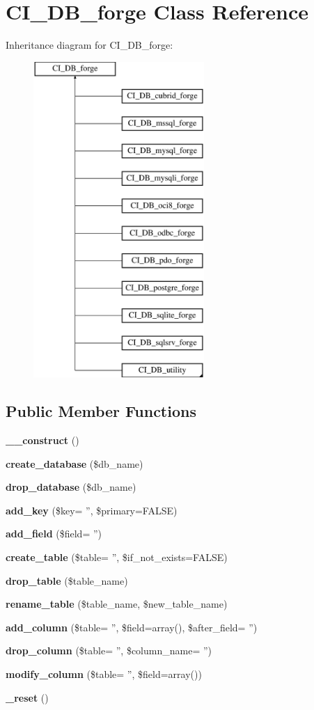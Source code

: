 \section{C\-I\-\_\-\-D\-B\-\_\-forge Class Reference}
\label{class_c_i___d_b__forge}
Inheritance diagram for C\-I\-\_\-\-D\-B\-\_\-forge\-:\begin{figure}[H]
\begin{center}
\leavevmode
\includegraphics[height=12.000000cm]{class_c_i___d_b__forge}
\end{center}
\end{figure}
\subsection*{Public Member Functions}
\begin{DoxyCompactItemize}
\item 
{\bf \-\_\-\-\_\-construct} ()
\item 
{\bf create\-\_\-database} (\$db\-\_\-name)
\item 
{\bf drop\-\_\-database} (\$db\-\_\-name)
\item 
{\bf add\-\_\-key} (\$key= '', \$primary=F\-A\-L\-S\-E)
\item 
{\bf add\-\_\-field} (\$field= '')
\item 
{\bf create\-\_\-table} (\$table= '', \$if\-\_\-not\-\_\-exists=F\-A\-L\-S\-E)
\item 
{\bf drop\-\_\-table} (\$table\-\_\-name)
\item 
{\bf rename\-\_\-table} (\$table\-\_\-name, \$new\-\_\-table\-\_\-name)
\item 
{\bf add\-\_\-column} (\$table= '', \$field=array(), \$after\-\_\-field= '')
\item 
{\bf drop\-\_\-column} (\$table= '', \$column\-\_\-name= '')
\item 
{\bf modify\-\_\-column} (\$table= '', \$field=array())
\item 
{\bf \-\_\-reset} ()
\end{DoxyCompactItemize}
